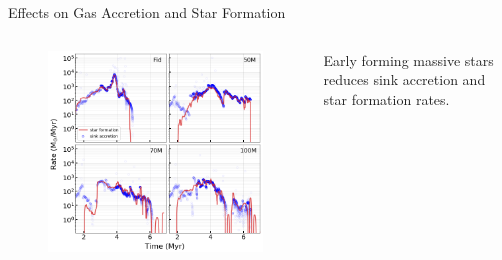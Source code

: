 \documentclass[aspectratio=169]{beamer}
\begin{document}
\begin{frame}{Effects on Gas Accretion and Star Formation}{}
    \begin{columns}
        \begin{column}{0.42\textwidth}
            \begin{figure}[h!]
                \centering
                \includegraphics[width=\linewidth]{../images/sink_accretion_star_formation_rates.png} \\
                \label{fig:sink_star_rates}
            \end{figure}
        \end{column}
        \begin{column}{0.42\textwidth}
            Early forming massive stars reduces sink accretion and star formation rates.
        \end{column}
    \end{columns}
\end{frame} 
\end{document}
